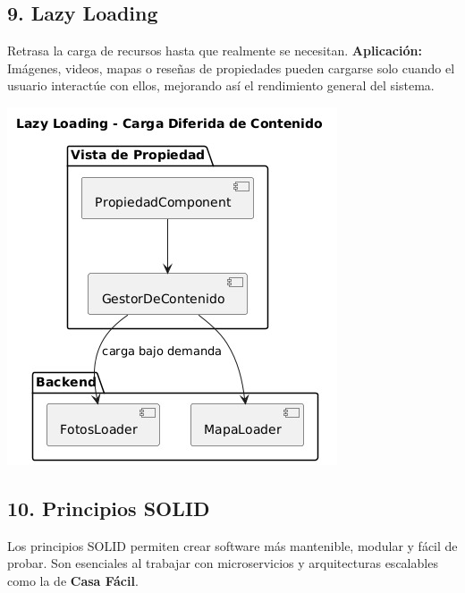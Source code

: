 	\subsection*{9. Lazy Loading}
		\noindent Retrasa la carga de recursos hasta que realmente se necesitan.  
		\textbf{Aplicación:} Imágenes, videos, mapas o reseñas de propiedades pueden cargarse solo cuando el usuario interactúe con ellos, mejorando así el rendimiento general del sistema.
		\begin{center}
			\includegraphics[width=\linewidth]{figures/patterns/lazy.jpg}
			\label{fig:img17}
		\end{center}
		
	\newpage
	\subsection*{10. Principios SOLID}
		\noindent Los principios SOLID permiten crear software más mantenible, modular y fácil de probar. Son esenciales al trabajar con microservicios y arquitecturas escalables como la de \textbf{Casa Fácil}.
		
